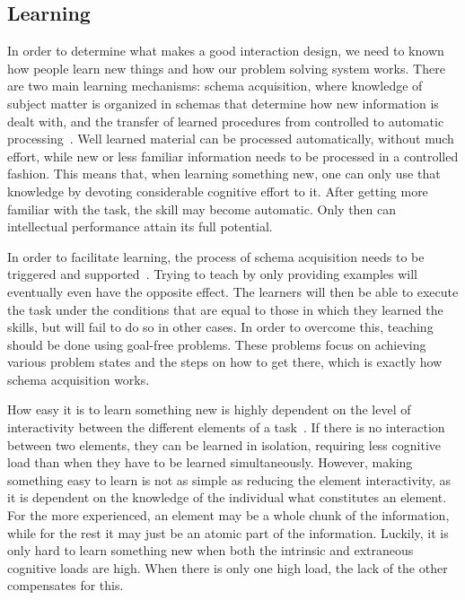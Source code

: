 \subsection{Learning}
In order to determine what makes a good interaction design, we need to known how people learn new things and how our problem solving system works. There are two main learning mechanisms: schema acquisition, where knowledge of subject matter is organized in schemas that determine how new information is dealt with, and the transfer of learned procedures from controlled to automatic processing~\cite{sweller1994cognitive}. Well learned material can be processed automatically, without much effort, while new or less familiar information needs to be processed in a controlled fashion. This means that, when learning something new, one can only use that knowledge by devoting considerable cognitive effort to it. After getting more familiar with the task, the skill may become automatic. Only then can intellectual performance attain its full potential.

In order to facilitate learning, the process of schema acquisition needs to be triggered and supported~\cite{sweller1994cognitive}. Trying to teach by only providing examples will eventually even have the opposite effect. The learners will then be able to execute the task under the conditions that are equal to those in which they learned the skills, but will fail to do so in other cases. In order to overcome this, teaching should be done using goal-free problems. These problems focus on achieving various problem states and the steps on how to get there, which is exactly how schema acquisition works.

How easy it is to learn something new is highly dependent on the level of interactivity between the different elements of a task~\cite{sweller1994cognitive}. If there is no interaction between two elements, they can be learned in isolation, requiring less cognitive load than when they have to be learned simultaneously. However, making something easy to learn is not as simple as reducing the element interactivity, as it is dependent on the knowledge of the individual what constitutes an element. For the more experienced, an element may be a whole chunk of the information, while for the rest it may just be an atomic part of the information. Luckily, it is only hard to learn something new when both the intrinsic and extraneous cognitive loads are high. When there is only one high load, the lack of the other compensates for this.

